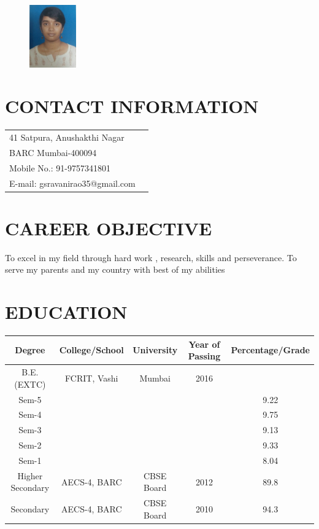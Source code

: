 \documentclass[line, margin]{res}
\begin{document}
 
\begin{figure}
	\raggedleft 
	\includegraphics[width=2cm ]{passportsize.jpg}
\end{figure} 
\begin{resume}

\vspace{5mm}
	
\section{\bf CONTACT INFORMATION}

\begin{tabular}{@{}p{3.5in}p{3in}}
	41 Satpura, Anushakthi Nagar    \\   
	BARC Mumbai-400094  \\
	{Mobile No.:}  91-9757341801 \\
	{E-mail:}  gsravanirao35@gmail.com \\
\end{tabular}

\section{\bf CAREER OBJECTIVE} 
To excel in my field through hard work , research, skills and perseverance. To serve my parents and my country with best of my abilities

\section{\bf EDUCATION}
\begin{tabular}{ |c|c|c|c|c| } 
	\hline
	Degree & College/School & University & Year of Passing & Percentage/Grade \\ [0.4ex] %
	\hline
	B.E.(EXTC) & FCRIT, Vashi & Mumbai & 2016 & \\ 
	Sem-5 &  &  &  & 9.22 \\
	Sem-4 &  &  &  & 9.75 \\
	Sem-3 &  &  &  & 9.13 \\
	Sem-2 &  &  &  & 9.33 \\
	Sem-1 &  &  &  & 8.04 \\
	\hline
	Higher Secondary & AECS-4, BARC & CBSE Board & 2012 & 89.8 \\
	\hline
	Secondary & AECS-4, BARC & CBSE Board & 2010 & 94.3 \\
	\hline
\end{tabular}


\end{resume}
\end{document}
